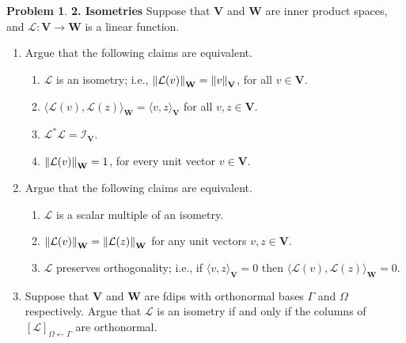 \documentclass{article}
\theoremstyle{definition}
\newtheorem*{prob*}{Problem}
\newcommand{\V}{\mathbf{V}}
\newcommand{\W}{\mathbf{W}}
\newcommand{\lag}{\mathcal{L}}
\newcommand{\la}{\langle}
\newcommand{\ra}{\rangle}
\begin{document}
\newpage







\begin{prob*}\textbf{2. Isometries} 
	Suppose that $\V$ and $\W$ are inner product spaces, and $\lag: \V \to \W$ is a linear function.
	\begin{enumerate}
		\item Argue that the following claims are equivalent.
		\begin{enumerate}
			\item $\lag$ is an isometry; i.e., $\norm{\lag(v)}_\W = \norm{v}_\V$, for all $v\in \V$.
			\item $\la \lag(v), \lag(z)\ra_\W = \la v,z \ra_\V$ for all $v,z\in \V$.
			\item $\lag^*\lag = \mathcal{I}_\V$.
			\item $\norm{\lag(v)}_\W = 1$, for every unit vector $v\in \V$.
		\end{enumerate}
	
	
	
		\item Argue that the following claims are equivalent.
		\begin{enumerate}
			\item $\lag$ is a scalar multiple of an isometry.
			\item $\norm{\lag(v)}_\W = \norm{\lag(z)}_\W$ for any unit vectors $v,z\in \V$.
			\item $\lag$ preserves orthogonality; i.e., if $\la v,z\ra_\V = 0$ then $\la \lag(v), \lag(z)\ra_\W = 0$.
		\end{enumerate}
	
	
	
		\item Suppose that $\V$ and $\W$ are fdips with orthonormal bases $\Gamma$ and $\Omega$ respectively. Argue that $\lag$ is an isometry if and only if the columns of $[\lag]_{\Omega\leftarrow\Gamma}$ are orthonormal.
	\end{enumerate}
	
\end{prob*}









\newpage
\end{document}
